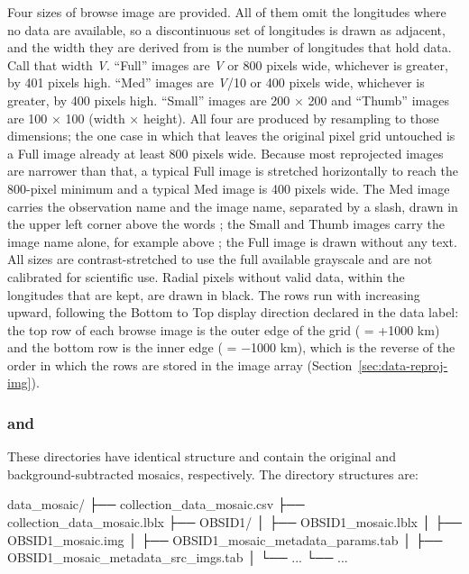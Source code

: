 Four sizes of browse image are provided. All of them omit the longitudes where no data are available, so a discontinuous set of longitudes is drawn as adjacent, and the width they are derived from is the number of longitudes that hold data. Call that width \textit{V}. “Full” images are \textit{V} or 800 pixels wide, whichever is greater, by 401 pixels high. “Med” images are \textit{V}/10 or 400 pixels wide, whichever is greater, by 400 pixels high. “Small” images are 200 × 200 and “Thumb” images are 100 × 100 (width × height). All four are produced by resampling to those dimensions; the one case in which that leaves the original pixel grid untouched is a Full image already at least 800 pixels wide. Because most reprojected images are narrower than that, a typical Full image is stretched horizontally to reach the 800-pixel minimum and a typical Med image is 400 pixels wide. The Med image carries the observation name and the image name, separated by a slash, drawn in the upper left corner above the words ; the Small and Thumb images carry the image name alone, for example  above ; the Full image is drawn without any text. All sizes are contrast-stretched to use the full available grayscale and are not calibrated for scientific use. Radial pixels without valid data, within the longitudes that are kept, are drawn in black. The rows run with \dr{} increasing upward, following the Bottom to Top display direction declared in the data label: the top row of each browse image is the outer edge of the grid (\dr{} = +1000 km) and the bottom row is the inner edge (\dr{} = −1000 km), which is the reverse of the order in which the rows are stored in the image array (Section~\ref{sec:data-reproj-img}).


\subsubsection{ and }
\label{sec:data-mosaic-and-data-mosaic-bkg-sub}

These directories have identical structure and contain the original and background-subtracted mosaics, respectively. The directory structures are:

\begin{CodeBlock}
data_mosaic/
├── collection_data_mosaic.csv
├── collection_data_mosaic.lblx
├── OBSID1/
│   ├── OBSID1_mosaic.lblx
│   ├── OBSID1_mosaic.img
│   ├── OBSID1_mosaic_metadata_params.tab
│   ├── OBSID1_mosaic_metadata_src_imgs.tab
│   └── ...
└── ...
\end{CodeBlock}


